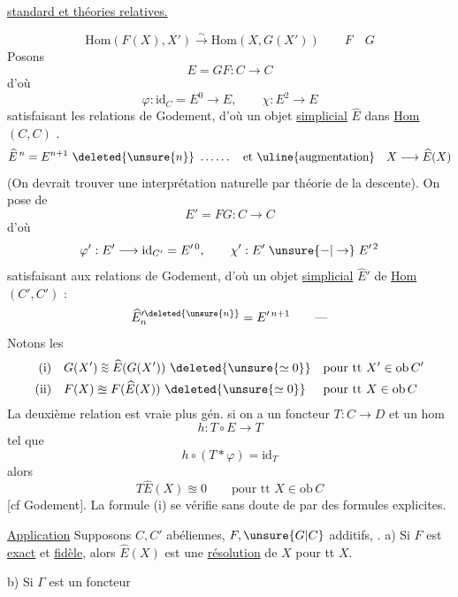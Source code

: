 \uline{ standard et théories relatives.}

\[
 \mathrm{Hom}(F(X),X')\xrightarrow{\sim}\mathrm{Hom}(X,G(X'))
 \qquad F\quad G
\]
Posons
\[
 E=GF:C\longrightarrow C
\]
d'où
\[
 \varphi:\mathrm{id}_C=E^0\longrightarrow E,\qquad \chi:E^2\longrightarrow E
\]
satisfaisant les relations de Godement, d'où un objet \uline{simplicial}  $\widehat E$ dans \uline{Hom} $(C,C)$ .
\[
 \widehat E^{\,n}=E^{n+1}\ \deleted{\unsure{n}}\ \ldots\ldots\quad
 \text{et \uline{augmentation}}\quad X\longrightarrow\widehat E(X)
\]
(On devrait trouver une interprétation naturelle par théorie de la descente). On pose de \textquotedbl
\[
 E'=FG:C\longrightarrow C
\]
d'où
\[
 \varphi':E'\longrightarrow\mathrm{id}_{C'}=E'^{\,0},\qquad
 \chi':E'\mathrel{\unsure{-|\to}}E'^{\,2}
\]
satisfaisant aux relations de Godement, d'où un objet \uline{simplicial} $\widehat E'$ de \uline{Hom} $(C',C')$ :
\[
 \widehat E'^{\deleted{\unsure{n}}}_{n}=E'^{\,n+1}\qquad\text{---}
\]
Notons les  
\[
 \begin{aligned}
 \text{(i)}\quad &G(X')\mathrel{\substack{\sim\\[-.7ex]\sim\\[-.7ex]\sim}}\widehat E(G(X'))\ \deleted{\unsure{\simeq0}}
       &&\text{pour tt }X'\in\mathrm{ob}\,C'\\
 \text{(ii)}\quad &F(X)\approxeq F(\widehat E(X))\ \deleted{\unsure{\simeq0}}
       &&\text{pour tt }X\in\mathrm{ob}\,C
 \end{aligned}
\]
La deuxième relation est vraie plus gén. si on a un foncteur $T:C\longrightarrow D$ et un hom 
\[
 h:T\circ E\longrightarrow T
\]
tel que
\[
 h\circ(T*\varphi)=\mathrm{id}_T
\]
alors
\[
 T\widehat E(X)\approxeq 0\qquad\text{pour tt }X\in\mathrm{ob}\,C
\]
[cf Godement]. La formule (i) se vérifie sans doute de \textquotedbl par des formules explicites.

\uline{Application} Supposons $C,C'$ abéliennes, $F,\unsure{G|C}$ additifs,  . a) Si $F$ est \uline{exact} et \uline{fidèle}, alors $\widehat E(X)$ est une \uline{résolution} de $X$ pour tt $X$.

b) Si $\Gamma$ est un foncteur
